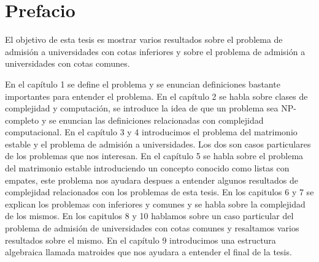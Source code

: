 \documentclass[11pt]{book}
\begin{document}



\chapter*{Prefacio}

\pagestyle{plain}

El objetivo de esta tesis es mostrar varios resultados sobre el problema de admisión a universidades con cotas inferiores y sobre el problema de admisión a universidades con cotas comunes. 

En el capítulo 1 se define el problema y se enuncian definiciones bastante importantes para entender el problema. 
En el capítulo 2 se habla sobre clases de complejidad y computación, se introduce la idea de que un problema sea NP-completo y se enuncian las definiciones relacionadas con complejidad computacional.
En el capítulo 3 y 4  introducimos el problema del matrimonio estable y el problema de admisión a universidades. Los dos son casos particulares de los problemas que nos interesan. 
En el capítulo 5 se habla sobre el problema del matrimonio estable introduciendo un concepto conocido como listas con empates, este problema nos ayudara despues a entender algunos resultados de complejidad relacionados con los problemas de esta tesis. 
En los capitulos 6 y 7 se explican los problemas con inferiores y comunes y se habla sobre la complejidad de los mismos. 
En los capitulos 8 y 10 hablamos sobre un caso particular del problema de admisión de universidades con cotas comunes y resaltamos varios resultados sobre el mismo. 
En el capítulo 9 introducimos una estructura algebraica llamada matroides que nos ayudara a entender el final de la tesis. 
\end{document}

